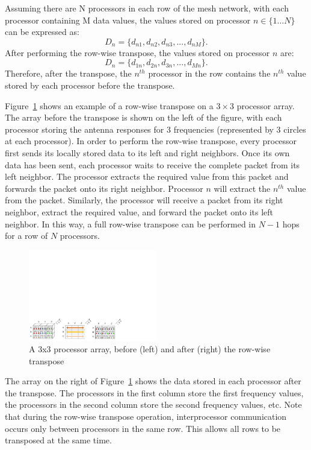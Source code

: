 \documentclass[twocolumn]{article}
\begin{document}
Assuming there are N processors in each row of the mesh network, with each processor containing M data values, the values stored on processor $n \in \{1 \ldots N\}$ can be expressed as:
\[ D_n = \{d_{n1}, d_{n2}, d_{n3}, ..., d_{nM}\}. \]
After performing the row-wise transpose, the values stored on processor $n$ are:
\[ D_n = \{d_{1n}, d_{2n}, d_{3n}, ..., d_{Mn}\}. \]
Therefore, after the transpose, the $n^{th}$ processor in the row contains the $n^{th}$ value stored by each processor before the transpose.

Figure~\ref{row_wise_transpose} shows an example of a row-wise transpose on a $3\times3$ processor array. The array before the transpose is shown on the left of the figure, with each processor storing the antenna responses for 3 frequencies (represented by 3 circles at each processor). In order to perform the row-wise transpose, every processor first sends its locally stored data to its left and right neighbors. Once its own data has been sent, each processor waits to receive the complete packet from its left neighbor. The processor extracts the required value from this packet and forwards the packet onto its right neighbor. Processor $n$ will extract the $n^{th}$ value from the packet. Similarly, the processor will receive a packet from its right neighbor, extract the required value, and forward the packet onto its left neighbor. In this way, a full row-wise transpose can be performed in $N-1$ hops for a row of $N$ processors.

\begin{figure}[!h]
\centering
\includegraphics*[width=0.5\textwidth, viewport = 10 10 620 150]{figures/row_wise_transpose.pdf}
\caption{A 3x3 processor array, before (left) and after (right) the row-wise transpose}
\label{row_wise_transpose}
\end{figure}

The array on the right of Figure~\ref{row_wise_transpose} shows the data stored in each processor after the transpose. The processors in the first column store the first frequency values, the processors in the second column store the second frequency values, etc. Note that during the row-wise transpose operation, interprocessor communication occurs only between processors in the same row. This allows all rows to be transposed at the same time.
\end{document}
